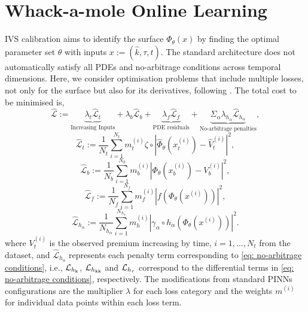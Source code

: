 \documentclass[sigconf, authorversion=true, nonacm=true]{acmart}
\begin{document}
\section{Whack-a-mole Online Learning}
\label{section: Whack-a-mole Online Learning (WamOL)}
IVS calibration aims to identify the surface $\Phi_{\theta}(x)$ by finding the optimal parameter set $\theta$ with inputs $x:=(\widehat{k}, \tau, t)$. The standard architecture does not automatically satisfy all PDEs and no-arbitrage conditions across temporal dimensions. Here, we consider optimisation problems that include multiple losses, not only for the surface but also for its derivatives, following \cite{EasyChair:15219}. The total cost to be minimised is,
\begin{equation}
    \widehat{\mathcal{L}} := \underbrace{\lambda_t \widehat{\mathcal{L}}_t}_{\text{Increasing Inputs}} + \lambda_b \widehat{\mathcal{L}}_b + \underbrace{\lambda_f \widehat{\mathcal{L}}_f}_{\text{PDE residuals}} + \underbrace{\Sigma_\alpha \lambda_{h_\alpha} \widehat{\mathcal{L}}_{h_\alpha}}_{\text{No-arbitrage penalties}},
    \label{eq: total loss function in WamOL}
\end{equation}
\begin{equation}
    \widehat{\mathcal{L}}_t :=\frac{1}{N_t} \sum_{i=1}^{N_t} m_t^{(i)} \zeta \circ \left|\widehat{\Phi}_{\theta}\left(x_t^{(i)}\right)-\widehat{V}_t^{(i)}\right|^2,
    \label{eq: WamOL price loss}
\end{equation}
\begin{equation}
    \widehat{\mathcal{L}}_b :=\frac{1}{N_b} \sum_{i=1}^{N_b} m_b^{(i)} \left|\Phi_{\theta}\left(x_b^{(i)}\right)-V_b^{(i)}\right|^2,
\end{equation}
\begin{equation}
    \widehat{\mathcal{L}}_f := \frac{1}{N_f} \sum_{i=1}^{N_f} m_f^{(i)} \left|f\left(\Phi_{\theta}\left(x^{(i)}\right)\right)\right|^2,
\end{equation}
\begin{equation}
    \widehat{\mathcal{L}}_{h_\alpha} := \frac{1}{N_{h_\alpha}} \sum_{i=1}^{N_{h_\alpha}} m_h^{(i)} \left| \gamma_\alpha \circ {h_\alpha}\left(\Phi_{\theta}\left(x^{(i)}\right)\right) \right|^2.
    \label{eq: WamOL no-arbitrage loss}
\end{equation}
where $V_t^{(i)}$ is the observed premium increasing by time, $i=1,\ldots,N_t$ from the dataset, and $\widehat{\mathcal{L}}_{h_\alpha}$ represents each penalty term corresponding to \eqref{eq: no-arbitrage conditions}, i.e., $\mathcal{L}_{h_{\rm k}}$, $\mathcal{L}_{h_{\rm kk}}$ and $\mathcal{L}_{h_{\rm \tau}}$ correspond to the differential terms in \eqref{eq: no-arbitrage conditions}, respectively. The modifications from standard PINNs configurations are the multiplier $\lambda$ for each loss category and the weights $m^{(i)}$ for individual data points within each loss term.
\end{document}
